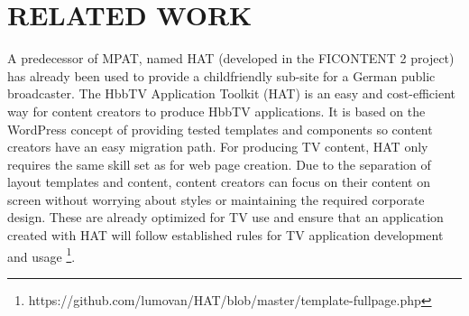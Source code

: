 \section{\textbf{RELATED WORK}}\label{sec:RELATED WORK}

A predecessor of MPAT, named HAT (developed in the FICONTENT
2 project) has already been used to provide a childfriendly
sub-site for a German public broadcaster. The HbbTV
Application Toolkit (HAT) is an easy and cost-efficient way
for content creators to produce HbbTV applications. It is based
on the WordPress concept of providing tested templates and
components so content creators have an easy migration path\cite{HAT}.
For producing TV content, HAT only requires the same skill
set as for web page creation. Due to the separation of layout
templates and content, content creators can focus on their
content on screen without worrying about styles or maintaining
the required corporate design. These are already optimized for
TV use and ensure that an application created with HAT will
follow established rules for TV application development and
usage \footnote{
https://github.com/lumovan/HAT/blob/master/template-fullpage.php}.





